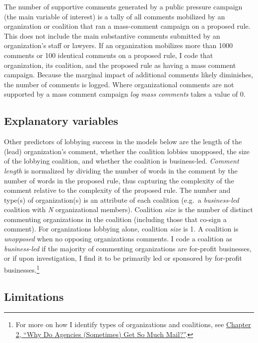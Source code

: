 \documentclass[
      12pt,
        ]{article}
\begin{document}
The number of supportive comments generated by a public pressure campaign (the main variable of interest) is a tally of all comments mobilized by an organization or coalition that ran a mass-comment campaign on a proposed rule. This does not include the main substantive comments submitted by an organization's staff or lawyers. If an organization mobilizes more than 1000 comments or 100 identical comments on a proposed rule, I code that organization, its coalition, and the proposed rule as having a mass comment campaign. Because the marginal impact of additional comments likely diminishes, the number of comments is logged. Where organizational comments are not supported by a mass comment campaign \emph{log mass comments} takes a value of 0.

\hypertarget{explanatory-variables}{%
\subsection{Explanatory variables}\label{explanatory-variables}}

Other predictors of lobbying success in the models below are the length of the (lead) organization's comment, whether the coalition lobbies unopposed, the size of the lobbying coalition, and whether the coalition is business-led. \emph{Comment length} is normalized by dividing the number of words in the comment by the number of words in the proposed rule, thus capturing the complexity of the comment relative to the complexity of the proposed rule. The number and type(s) of organization(s) is an attribute of each coalition (e.g.~a \emph{business-led} coalition with \emph{N} organizational members). Coalition \emph{size} is the number of distinct commenting organizations in the coalition (including those that co-sign a comment). For organizations lobbying alone, coalition \emph{size} is 1. A coalition is \emph{unopposed} when no opposing organizations comments. I code a coalition as \emph{business-led} if the majority of commenting organizations are for-profit businesses, or if upon investigation, I find it to be primarily led or sponsored by for-profit businesses.\footnote{For more on how I identify types of organizations and coalitions, see \href{https://judgelord.github.io/dissertation/whyMail.pdf}{Chapter 2, ``Why Do Agencies (Sometimes) Get So Much Mail?''}.}

\hypertarget{limitations}{%
\subsection{Limitations}\label{limitations}}
\end{document}
